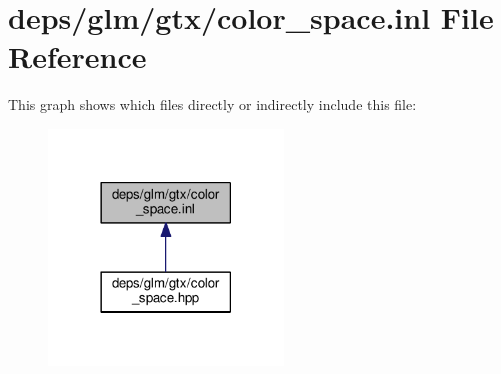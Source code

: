 \hypertarget{gtx_2color__space_8inl}{}\section{deps/glm/gtx/color\+\_\+space.inl File Reference}
\label{gtx_2color__space_8inl}
This graph shows which files directly or indirectly include this file\+:
\nopagebreak
\begin{figure}[H]
\begin{center}
\leavevmode
\includegraphics[width=177pt]{de/dd7/gtx_2color__space_8inl__dep__incl}
\end{center}
\end{figure}
